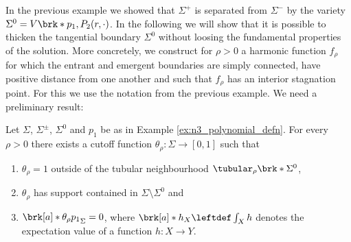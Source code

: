 In the previous example we showed that $\Sigma^+$ is separated from $\Sigma^-$ by the variety
$\Sigma^0=V\brk*{p_1,P_2(r,\cdot)}$. In the following we will show that it is possible to thicken 
the tangential boundary $\Sigma^0$ without loosing the fundamental properties of the solution. 
More concretely, we construct for $\rho>0$ a harmonic function $f_\rho$ for which the entrant and
emergent boundaries are simply connected, have positive distance from one another
and such that $f_\rho$ has an interior stagnation point.
For this we use the notation from the previous example.
We need a preliminary result:
\begin{proposition}\label{pr:n3_thickening_cutoff}
  Let $\Sigma$, $\Sigma^\pm$, $\Sigma^0$ and $p_1$ be as in Example \ref{ex:n3_polynomial_defn}. For every $\rho>0$ there exists a cutoff function $\theta_\rho\colon\Sigma\to[0,1]$ such that
  \begin{enumerate}
    \item $\theta_\rho=1$ outside of the tubular neighbourhood $\tubular_{\rho}\brk*{\Sigma^0}$,\label{en:n3_thickening_cutoff_1}
    \item $\theta_\rho$ has support contained in $\Sigma\setminus\Sigma^0$ and\label{en:n3_thickening_cutoff_2}
    \item $\brk[a]*{\theta_\rho p_1}_\Sigma=0$, where $\brk[a]*{h}_X\leftdef\int_Xh$ denotes the expectation value of a function $h\colon X\to Y$.\label{en:n3_thickening_cutoff_3}
  \end{enumerate}
\end{proposition}


